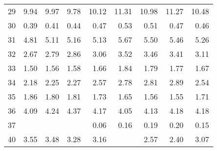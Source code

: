 \begin{table}[]
\begin{center}
\begin{tabular}{crrrrrrrr}
29    & 9.94                     & 9.97                     & 9.78                     & 10.12                    & 11.31                    & 10.98                    & 11.27                    & 10.48                       \\
30    & 0.39                     & 0.41                     & 0.44                     & 0.47                     & 0.53                     & 0.51                     & 0.47                     & 0.46                        \\
31    & 4.81                     & 5.11                     & 5.16                     & 5.13                     & 5.67                     & 5.50                     & 5.46                     & 5.26                        \\
32    & 2.67                     & 2.79                     & 2.86                     & 3.06                     & 3.52                     & 3.46                     & 3.41                     & 3.11                        \\
33    & 1.50                     & 1.56                     & 1.58                     & 1.66                     & 1.84                     & 1.79                     & 1.77                     & 1.67                        \\
34    & 2.18                     & 2.25                     & 2.27                     & 2.57                     & 2.78                     & 2.81                     & 2.89                     & 2.54                        \\
35    & 1.86                     & 1.80                     & 1.81                     & 1.73                     & 1.65                     & 1.56                     & 1.55                     & 1.71                        \\
36    & 4.09                     & 4.24                     & 4.37                     & 4.17                     & 4.05                     & 4.13                     & 4.18                     & 4.18                        \\
37    &                          &                          &                          & 0.06                     & 0.16                     & 0.19                     & 0.20                     & 0.15                        \\
40    & 3.55                     & 3.48                     & 3.28                     & 3.16                     &                          & 2.57                     & 2.40                     & 3.07                        \\

\end{tabular}
\end{center}
\end{table}
